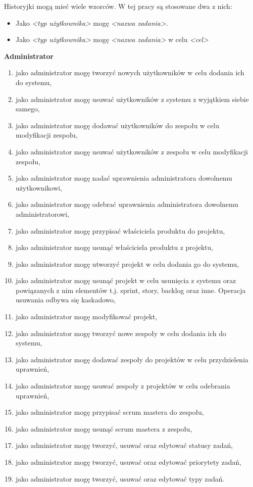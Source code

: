 Historyjki mogą mieć wiele wzorców. W tej pracy są stosowane dwa z nich:
\begin{itemize}
	\item Jako \textit{\textless typ użytkownika\textgreater} mogę \textit{\textless nazwa zadania\textgreater}.
	\item Jako \textit{\textless typ użytkownika\textgreater} mogę \textit{\textless nazwa zadania\textgreater} w celu \textit{\textless cel\textgreater}\cite{SCRUM}
\end{itemize} 


\textbf{Administrator}
\begin{enumerate}	
	\item jako administrator mogę tworzyć nowych użytkowników w celu dodania ich do systemu,
	\item jako administrator mogę usuwać użytkowników z systemu z wyjątkiem siebie samego,
	\item jako administrator mogę dodawać użytkowników do zespołu w celu modyfikacji zespołu,
	\item jako administrator mogę usuwać użytkowników z zespołu w celu modyfikacji zespołu,
	\item jako administrator mogę nadać uprawnienia administratora dowolnemu użytkownikowi,
	\item jako administrator mogę odebrać uprawnienia administratora dowolnemu administratorowi,
	\item jako administrator mogę przypisać właściciela produktu do projektu,
	\item jako administrator mogę usunąć właściciela produktu z projektu,
	\item jako administrator mogę utworzyć projekt w celu dodania go do systemu,
	\item jako administrator mogę usunąć projekt w celu usunięcia z systemu oraz powiązanych z nim elementów t.j. sprint, story, backlog oraz inne. Operacja usuwania odbywa się kaskadowo,
	\item jako administrator mogę modyfikować projekt,
	\item jako administrator mogę tworzyć nowe zespoły w celu dodania ich do systemu,
	\item jako administrator mogę dodawać zespoły do projektów w celu przydzielenia uprawnień,
	\item jako administrator mogę usuwać zespoły z projektów w celu odebrania uprawnień,
	\item jako administrator mogę przypisać scrum mastera do zespołu,
	\item jako administrator mogę usunąć scrum mastera z zespołu,
	\item jako administrator mogę tworzyć, usuwać oraz edytować statusy zadań,
	\item jako administrator mogę tworzyć, usuwać oraz edytować priorytety zadań,
	\item jako administrator mogę tworzyć, usuwać oraz edytować typy zadań.
\end{enumerate}		
